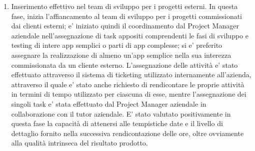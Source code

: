\begin{enumerate}
	\item	Inserimento effettivo nel team di sviluppo per i progetti esterni. In questa fase, inizia l'affiancamento al team di sviluppo per i progetti commissionati dai clienti esterni; e' iniziato quindi il coordinamento dal Project Manager aziendale nell’assegnazione di task appositi comprendenti le fasi di sviluppo e testing di intere app semplici o parti di app complesse; si e' preferito assegnare la realizzazione di almeno un’app semplice nella sua interezza commissionata da un cliente esterno. L’assegnazione delle attività e' stato effettuato attraverso il sistema di ticketing utilizzato internamente all’azienda, attraverso il quale e' stato anche richiesto di rendicontare le proprie attività in termini di tempo utilizzato per ciascuna di esse, mentre l’assegnazione dei singoli task e' stata effettuato dal Project Manager aziendale in collaborazione con il tutor aziendale. E' stato valutato positivamente in questa fase la capacità di attenersi alle tempistiche date e il livello di dettaglio fornito nella successiva rendicontazione delle ore, oltre ovviamente alla qualità intrinseca del risultato prodotto. 
\end{enumerate}

